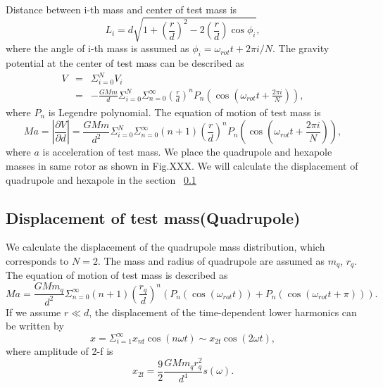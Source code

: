 \documentclass[12pt]{iopart}
\begin{document}
Distance between i-th mass and center of test mass is 
\begin{equation}
L_i=d \sqrt{1+\left( \frac{r}{d} \right)^2 -2\left( \frac{r}{d} \right) \cos{\phi_i} },
\end{equation}
where the angle of i-th mass is assumed as $\phi_i=\omega_{rot} t + 2\pi i/N$.
The gravity potential at the center of test mass can be described as
\begin{eqnarray}
V &=& \Sigma^N_{i=0} V_i \\
&=&-\frac{GMm}{d} \Sigma^N_{i=0} \Sigma^{\infty}_{n=0} \left( \frac{r}{d} \right)^n P_n\left(\cos{\left(\omega_{rot} t +\frac{2 \pi i}{N}\right)}\right),
\end{eqnarray}
where $P_n$ is Legendre polynomial. The equation of motion of test mass is 
\begin{equation}
Ma=\left| \frac{\partial V}{\partial{d}} \right| =\frac{GMm}{d^2}\Sigma^N_{i=0} \Sigma^{\infty}_{n=0}(n+1) \left( \frac{r}{d} \right)^n P_n\left(\cos{\left(\omega_{rot} t +\frac{2 \pi i}{N}\right)}\right),
\end{equation}
where $a$ is acceleration of test mass. We place the quadrupole and hexapole masses in same rotor as shown in Fig.XXX. We will calculate the displacement of quadrupole and hexapole in the section ~\ref{Quad} 
\subsection{Displacement of test mass(Quadrupole)} \label{Quad}
We calculate the displacement of the quadrupole mass distribution, which corresponds to $N=2$.
The mass and radius of quadrupole are assumed as $m_q$, $r_q$. 
The equation of motion of test mass is described as
\begin{equation}
Ma=\frac{GMm_q}{d^2}\Sigma^{\infty}_{n=0}(n+1) \left( \frac{r_q}{d} \right)^n \left( P_n\left(\cos{\left(\omega_{rot} t \right)}\right) + P_n\left(\cos{\left(\omega_{rot} t +\pi \right)}\right) \right).
\end{equation} 
If we assume $r \ll d$, the displacement of the time-dependent lower harmonics can be written by 
\begin{equation}
x=\Sigma_{i=1}^{\infty}x_{n\mathrm{f}}\cos(n\omega t)\sim x_{2\mathrm{f}}\cos(2\omega t),
\end{equation}
where amplitude of 2-f is
\begin{equation}
x_{2\mathrm{f}}=\frac{9}{2}\frac{GMm_{q}r_{q}^2}{d^4}s(\omega). \label{2f}
\end{equation}
\end{document}
